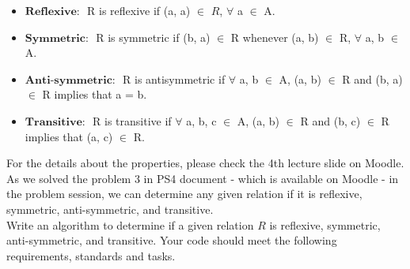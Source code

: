 \documentclass[a4 paper]{article}
\numberwithin{equation}{section}
\newcommand{\0}{\mathbf{0}}
\begin{document}
\begin{itemize}
	\item $\textbf{Reflexive: }$ R is reflexive if (a, a) $\in$ $R$, $\forall$ a $\in$ A.
	\item $\textbf{Symmetric: }$ R is symmetric if (b, a) $\in$ R whenever (a, b) $\in$ R, $\forall$ a, b $\in$ A.
	\item $\textbf{Anti-symmetric: }$ R is antisymmetric if $\forall$ a, b $\in$ A, (a, b) $\in$ R and (b, a) $\in$ R implies that a = b.
	\item $\textbf{Transitive: }$ R is transitive if $\forall$ a, b, c $\in$ A, (a, b) $\in$ R and (b, c) $\in$ R implies that (a, c) $\in$ R.
\end{itemize}
For the details about the properties, please check the 4th lecture slide on Moodle. \\

As we solved the problem 3 in PS4 document - which is available on Moodle - in the problem session, we can determine any given relation if it is reflexive, symmetric, anti-symmetric, and transitive.\\

Write an algorithm to determine if a given relation $R$ is reflexive, symmetric, anti-symmetric, and transitive. Your code should meet the following requirements, standards and tasks.
\end{document}
